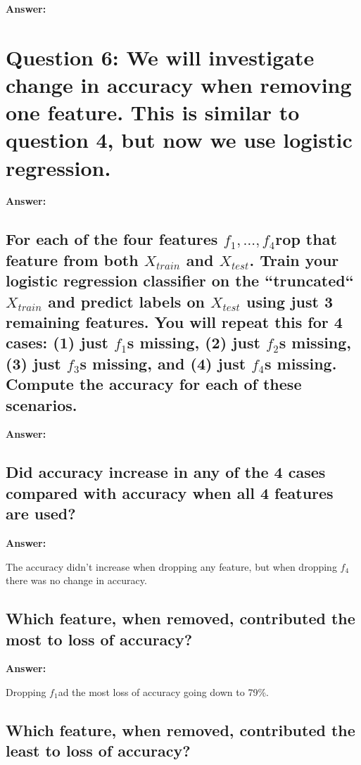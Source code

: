 \documentclass[12pt, a4paper]{extarticle}
\newcommand{\answer}[1]{\textbf{Answer: }\par#1}
\newcommand{\xtest}{\texorpdfstring{$X_{test}$}}
\newcommand{\xtrain}{\texorpdfstring{$X_{train}$}}
\newcommand{\var}[1]{\texorpdfstring{#1}\xspace}
\newcommand{\fixture}[1]{\texorpdfstring{\ensuremath{f_{#1}}}\xspace}
\begin{document}
    \answer{}

    \section{Question 6: {\normalfont\normalsize{We will investigate change in accuracy when removing one feature. This is similar to question 4, but now we use logistic regression.}}} \label{sec:question6}

    \answer{}

    \subsection{For each of the four features \var{$f_1,\dots,f_4$} drop that feature from both \xtrain{} and \xtest{}. Train your logistic regression classifier on the ``truncated`` \xtrain{} and predict labels on \xtest{} using just 3 remaining features. You will repeat this for 4 cases: (1) just \fixture{1} is missing, (2) just \fixture{2} is missing, (3) just \fixture{3} is missing, and (4) just \fixture{4} is missing. Compute the accuracy for each of these scenarios.} \label{subsec:question6.1}

    \answer{}

    \subsection{Did accuracy increase in any of the 4 cases compared with accuracy when all 4 features are used?} \label{subsec:question6.2}

    \answer{The accuracy didn't increase when dropping any feature, but when dropping \fixture{4}, there was no change in accuracy.}

    \subsection{Which feature, when removed, contributed the most to loss of accuracy?} \label{subsec:question6.3}

    \answer{Dropping \fixture{1} had the most loss of accuracy going down to 79\%.}

    \subsection{Which feature, when removed, contributed the least to loss of accuracy?} \label{subsec:question6.4}
\end{document}
